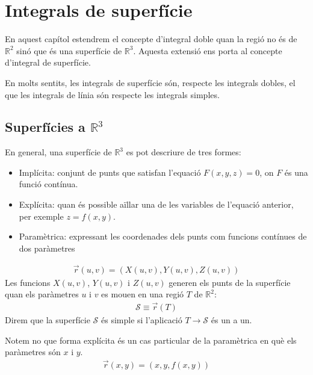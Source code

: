 \section{Integrals de superfície}
En aquest capítol estendrem el concepte d'integral doble quan la regió no és de $\mathbb{R}^{2}$ sinó que és una superfície de $\mathbb{R}^{3}$. Aquesta extensió ens porta al concepte d'integral de superfície.

En molts sentits, les integrals de superfície són, respecte les integrals dobles, el que les integrals de línia són respecte les integrals simples.

\subsection{Superfícies a $\mathbb{R}^{3}$}
En general, una superfície de $\mathbb{R}^{3}$ es pot descriure de tres formes:
\begin{itemize}
	\item Implícita: conjunt de punts que satisfan l'equació $F(x,y,z) = 0$, on $F$ és una funció contínua.
	\item Explícita: quan és possible aïllar una de les variables de l'equació anterior, per exemple $z = f(x,y)$.
	\item Paramètrica: expressant les coordenades dels punts com funcions contínues de dos paràmetres
\end{itemize}
\begin{align*}
	\vec{r}(u,v) = (X(u,v), Y(u,v), Z(u,v))
\end{align*}
Les funcions $X(u,v)$, $Y(u,v)$ i $Z(u,v)$ generen els punts de la superfície quan els paràmetres $u$ i $v$ es mouen en una regió $T$ de $\mathbb{R}^{2}$:
\begin{align*}
	\mathcal{S} \equiv \vec{r}(T)
\end{align*}
Direm que la superfície $\mathcal{S}$ és simple si l'aplicació $T \to \mathcal{S}$ és un a un.

Notem no que forma explícita és un cas particular de la paramètrica en què els paràmetres són $x$ i $y$.
\begin{align*}
	\vec{r}(x,y) = (x,y,f(x,y))
\end{align*}


